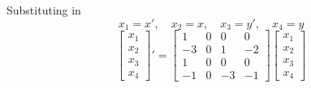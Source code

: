 Substituting in 
\[
    x_1 = x', \quad x_2  = x, \quad x_3 = y', \quad x_4 = y
\]
\[
    \begin{bmatrix}
        x_1 \\ x_2 \\ x_3 \\ x_4
    \end{bmatrix}'
    =
    \begin{bmatrix}
        1 & 0 & 0 & 0 \\
        -3 & 0 & 1 & -2 \\
        1 & 0 & 0 & 0 \\
        -1 & 0 & -3 & -1 
    \end{bmatrix}
    \begin{bmatrix}
        x_1 \\ x_2 \\ x_3 \\ x_4
    \end{bmatrix}
\]
